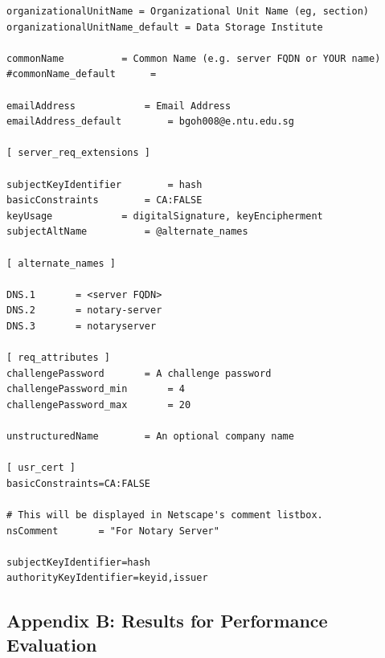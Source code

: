 \documentclass[a4paper,12pt]{article}
\begin{document}
{{\begin{verbatim}
organizationalUnitName = Organizational Unit Name (eg, section)
organizationalUnitName_default = Data Storage Institute

commonName          = Common Name (e.g. server FQDN or YOUR name)
#commonName_default      = 

emailAddress            = Email Address
emailAddress_default        = bgoh008@e.ntu.edu.sg

[ server_req_extensions ]

subjectKeyIdentifier        = hash
basicConstraints        = CA:FALSE
keyUsage            = digitalSignature, keyEncipherment
subjectAltName          = @alternate_names

[ alternate_names ]

DNS.1       = <server FQDN>
DNS.2       = notary-server
DNS.3       = notaryserver

[ req_attributes ]
challengePassword		= A challenge password
challengePassword_min		= 4
challengePassword_max		= 20

unstructuredName		= An optional company name

[ usr_cert ]
basicConstraints=CA:FALSE

# This will be displayed in Netscape's comment listbox.
nsComment		= "For Notary Server"

subjectKeyIdentifier=hash
authorityKeyIdentifier=keyid,issuer
\end{verbatim}
	\newpage
	\subsection{Appendix B: Results for Performance Evaluation}
}}
\end{document}
